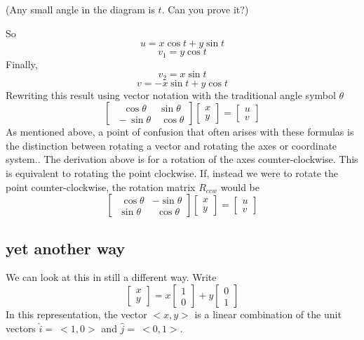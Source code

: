 \documentclass[11pt, oneside]{article}   	%
\begin{document}
(Any small angle in the diagram is $t$.  Can you prove it?)

So 
\[ u = x \cos t + y \sin t \]
\[ v_1 = y \cos t \]
Finally, 
\[ v_2 = x \sin t \]
\[ v = -  x \sin t + y \cos t \]
Rewriting this result using vector notation with the traditional angle symbol $\theta$
\[
\begin{bmatrix}   \ \ \ \ \cos \theta & \sin \theta  \\  \ -\sin \theta & \ \cos \theta  \end{bmatrix}
\begin{bmatrix}   x   \\  y  \end{bmatrix} = \begin{bmatrix}   u   \\  v  \end{bmatrix}
\]
As mentioned above, a point of confusion that often arises with these formulas is the distinction between rotating a vector and rotating the axes or coordinate system..  The derivation above is for a rotation of the axes counter-clockwise.  This is equivalent to rotating the point clockwise.  If, instead we were to rotate the point counter-clockwise, the rotation matrix $R_{ccw}$ would be
\[
\begin{bmatrix}   \ \ \cos \theta & -\sin \theta  \\  \ \sin \theta & \ \ \cos \theta  \end{bmatrix}
\begin{bmatrix}   x   \\  y  \end{bmatrix} = \begin{bmatrix}   u   \\  v  \end{bmatrix}
\]
\subsection*{yet another way}
We can look at this in still a different way.  Write
\[
\begin{bmatrix}  x \\ y \end{bmatrix}
=
x
\begin{bmatrix}  1 \\ 0 \end{bmatrix}
+
y
\begin{bmatrix}  0 \\ 1 \end{bmatrix}
\]
In this representation, the vector $<x,y>$ is a linear combination of the unit vectors $\hat{i}=\ <1,0>$ and $\hat{j}=\ <0,1>$.
\end{document}
